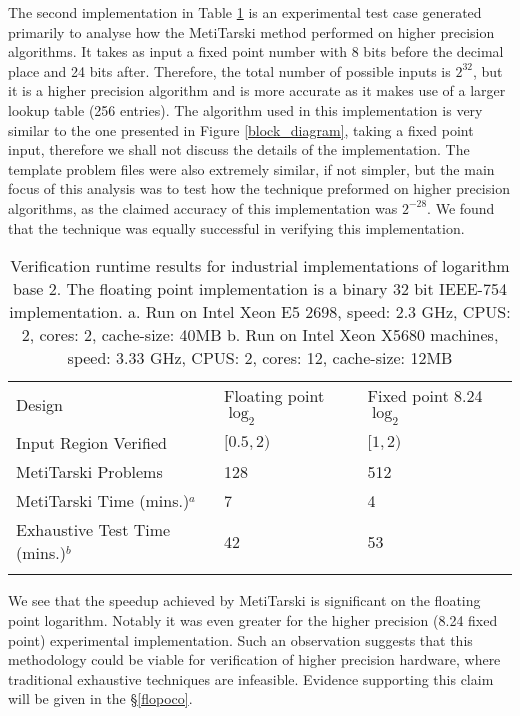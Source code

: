 \documentclass{fac}
\begin{document}
The second implementation in Table \ref{result} is an experimental test case generated primarily to analyse how the MetiTarski method performed on higher precision algorithms. It takes as input a fixed point number with 8 bits before the decimal place and 24 bits after. Therefore, the total number of possible inputs is $2^{32}$, but it is a higher precision algorithm and is more accurate as it makes use of a larger lookup table (256 entries). The algorithm used in this implementation is very similar to the one presented in Figure \ref{block_diagram}, taking a fixed point input, therefore we shall not discuss the details of the implementation. The template problem files were also extremely similar, if not simpler, but the main focus of this analysis was to test how the technique preformed on higher precision algorithms, as the claimed accuracy of this implementation was $2^{-28}$. We found that the technique was equally successful in verifying this implementation. 

\begin{table}
\begin{tabular}{lll}
\hline\noalign{\smallskip}
Design & Floating point $\log_2$ & Fixed point 8.24 $\log_2$    \\

\noalign{\smallskip}\hline\noalign{\smallskip}

 Input Region Verified& $[0.5,2)$ & $[1,2) $ \\ 
 MetiTarski Problems & 128 & 512 \\
 MetiTarski Time (mins.)$^a$ &  7 & 4 \\ 
 Exhaustive Test Time (mins.)$^b$ & 42 & 53 \\
\noalign{\smallskip}\hline
\end{tabular}
\caption{Verification runtime results for industrial implementations of logarithm base 2. The floating point implementation is a binary 32 bit IEEE-754 implementation.\newline
a. Run on Intel Xeon E5 2698, speed: 2.3 GHz, CPUS: 2, cores: 2, cache-size: 40MB
\newline
b. Run on Intel Xeon X5680 machines, speed: 3.33 GHz, CPUS: 2, cores: 12, cache-size: 12MB}\label{result}     
\end{table}

We see that the speedup achieved by MetiTarski is significant on the floating point logarithm. Notably it was even greater for the higher precision (8.24 fixed point) experimental implementation. Such an observation suggests that this methodology could be viable for verification of higher precision hardware, where traditional exhaustive techniques are infeasible. Evidence supporting this claim will be given in the \S \ref{flopoco}.
\end{document}
